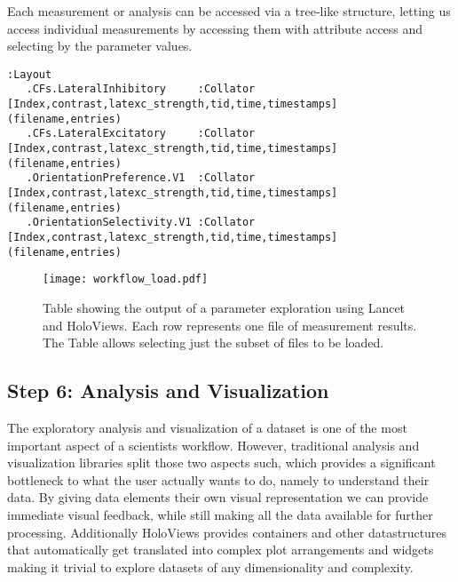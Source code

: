 Each measurement or analysis can be accessed via a tree-like
structure, letting us access individual measurements by accessing them
with attribute access and selecting by the parameter values.

\begin{lstlisting}[frame=single]  % Start your code-block
  :Layout
   .CFs.LateralInhibitory     :Collator   [Index,contrast,latexc_strength,tid,time,timestamps]   (filename,entries)
   .CFs.LateralExcitatory     :Collator   [Index,contrast,latexc_strength,tid,time,timestamps]   (filename,entries)
   .OrientationPreference.V1  :Collator   [Index,contrast,latexc_strength,tid,time,timestamps]   (filename,entries)
   .OrientationSelectivity.V1 :Collator   [Index,contrast,latexc_strength,tid,time,timestamps]   (filename,entries)
\end{lstlisting}


\begin{figure}
	\centering
        \texttt{[image: workflow\_load.pdf]}
	    \caption[Table summarizing results from parameter analysis in
          Lancet and HoloViews.]{Table showing the output of a
          parameter exploration using Lancet and HoloViews. Each row
          represents one file of measurement results. The Table allows
          selecting just the subset of files to be loaded.}
	\label{workflow_load}
\end{figure}


\subsection{Step 6: Analysis and Visualization}

The exploratory analysis and visualization of a dataset is one of the
most important aspect of a scientists workflow. However, traditional
analysis and visualization libraries split those two aspects such,
which provides a significant bottleneck to what the user actually
wants to do, namely to understand their data. By giving data elements
their own visual representation we can provide immediate visual
feedback, while still making all the data available for further
processing. Additionally HoloViews provides containers and other
datastructures that automatically get translated into complex plot
arrangements and widgets making it trivial to explore datasets of any
dimensionality and complexity.

